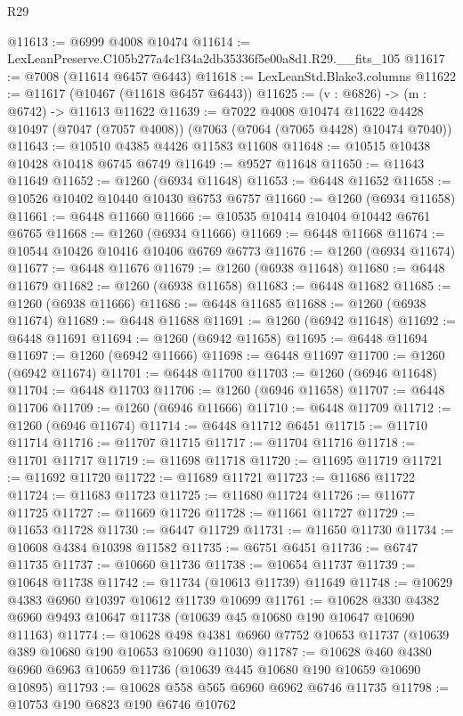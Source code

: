 \begin{lexlean}{R29}
\begin{coremodule}
@11613 := @6999 @4008 @10474
@11614 := LexLeanPreserve.C105b277a4c1f34a2db35336f5e00a8d1.R29.__fits_105
@11617 := @7008 (@11614 @6457 @6443)
@11618 := LexLeanStd.Blake3.columns
@11622 := @11617 (@10467 (@11618 @6457 @6443))
@11625 := (v : @6826) -> (m : @6742) -> @11613 @11622
@11639 := @7022
    @4008
    @10474
    @11622
    @4428
    @10497
    (@7047 (@7057 @4008))
    (@7063 (@7064 (@7065 @4428) @10474 @7040))
@11643 := @10510 @4385 @4426 @11583 @11608
@11648 := @10515 @10438 @10428 @10418 @6745 @6749
@11649 := @9527 @11648
@11650 := @11643 @11649
@11652 := @1260 (@6934 @11648)
@11653 := @6448 @11652
@11658 := @10526 @10402 @10440 @10430 @6753 @6757
@11660 := @1260 (@6934 @11658)
@11661 := @6448 @11660
@11666 := @10535 @10414 @10404 @10442 @6761 @6765
@11668 := @1260 (@6934 @11666)
@11669 := @6448 @11668
@11674 := @10544 @10426 @10416 @10406 @6769 @6773
@11676 := @1260 (@6934 @11674)
@11677 := @6448 @11676
@11679 := @1260 (@6938 @11648)
@11680 := @6448 @11679
@11682 := @1260 (@6938 @11658)
@11683 := @6448 @11682
@11685 := @1260 (@6938 @11666)
@11686 := @6448 @11685
@11688 := @1260 (@6938 @11674)
@11689 := @6448 @11688
@11691 := @1260 (@6942 @11648)
@11692 := @6448 @11691
@11694 := @1260 (@6942 @11658)
@11695 := @6448 @11694
@11697 := @1260 (@6942 @11666)
@11698 := @6448 @11697
@11700 := @1260 (@6942 @11674)
@11701 := @6448 @11700
@11703 := @1260 (@6946 @11648)
@11704 := @6448 @11703
@11706 := @1260 (@6946 @11658)
@11707 := @6448 @11706
@11709 := @1260 (@6946 @11666)
@11710 := @6448 @11709
@11712 := @1260 (@6946 @11674)
@11714 := @6448 @11712 @6451
@11715 := @11710 @11714
@11716 := @11707 @11715
@11717 := @11704 @11716
@11718 := @11701 @11717
@11719 := @11698 @11718
@11720 := @11695 @11719
@11721 := @11692 @11720
@11722 := @11689 @11721
@11723 := @11686 @11722
@11724 := @11683 @11723
@11725 := @11680 @11724
@11726 := @11677 @11725
@11727 := @11669 @11726
@11728 := @11661 @11727
@11729 := @11653 @11728
@11730 := @6447 @11729
@11731 := @11650 @11730
@11734 := @10608 @4384 @10398 @11582
@11735 := @6751 @6451
@11736 := @6747 @11735
@11737 := @10660 @11736
@11738 := @10654 @11737
@11739 := @10648 @11738
@11742 := @11734 (@10613 @11739) @11649
@11748 := @10629 @4383 @6960 @10397 @10612 @11739 @10699
@11761 := @10628 @330 @4382 @6960 @9493 @10647 @11738 (@10639 @45 @10680 @190 @10647 @10690 @11163)
@11774 := @10628 @498 @4381 @6960 @7752 @10653 @11737 (@10639 @389 @10680 @190 @10653 @10690 @11030)
@11787 := @10628 @460 @4380 @6960 @6963 @10659 @11736 (@10639 @445 @10680 @190 @10659 @10690 @10895)
@11793 := @10628 @558 @565 @6960 @6962 @6746 @11735
@11798 := @10753 @190 @6823 @190 @6746 @10762

\end{coremodule}
\end{lexlean}
